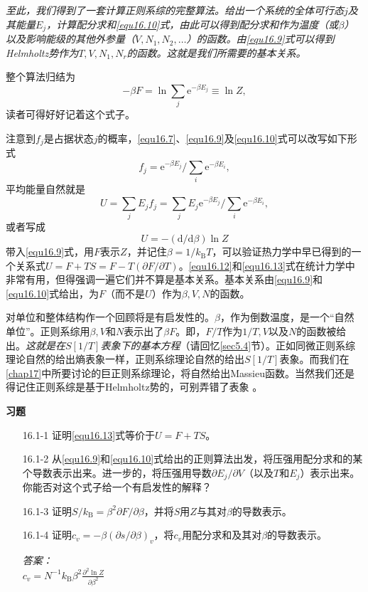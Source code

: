 {\it 至此，我们得到了一套计算正则系综的完整算法。给出一个系统的全体可行态$j$及其能量$E_j$，计算配分求和\ref{equ16.10}式，由此可以得到配分求和作为温度（或$\beta$）以及影响能级的其他外参量（$V,N_1,N_2,\dots$）的函数。由\eqref{equ16.9}式可以得到Helmholtz势作为$T,V,N_1,N_r$的函数。这就是我们所需要的基本关系。}

整个算法归结为
\begin{equation*}
-\beta F = \ln \sum\limits_j \mathrm e^{-\beta E_j} \equiv \ln Z,
\end{equation*}
读者可得好好记着这个式子。

注意到$f_j$是占据状态$j$的概率，\eqref{equ16.7}、\eqref{equ16.9}及\eqref{equ16.10}式可以改写如下形式
\begin{equation}
f_j  = {\mathrm e}^{-\beta E_j}/\sum\limits_i \mathrm e^{-\beta E_i},
\end{equation}
平均能量自然就是
\begin{equation}
U = \sum\limits_j E_jf_j = \sum\limits_j E_j{\mathrm e}^{-\beta E_j}/\sum\limits_i \mathrm e^{-\beta E_i},
\label{equ16.12}
\end{equation}
或者写成
\begin{equation}
U = -(\mathrm d/\mathrm d\beta)\ln Z
\label{equ16.13}
\end{equation}
带入\eqref{equ16.9}式，用$F$表示$Z$，并记住$\beta = 1/k_\text{B}T$，可以验证热力学中早已得到的一个关系式$U=F+TS=F-T(\partial F/\partial T)$。\eqref{equ16.12}和\eqref{equ16.13}式在统计力学中非常有用，但得强调一遍它们并不算是基本关系。基本关系由\eqref{equ16.9}和\eqref{equ16.10}式给出，为$F$（而不是$U$）作为$\beta,V,N$的函数。

对单位和整体结构作一个回顾将是有启发性的。$\beta$，作为倒数温度，是一个“自然单位”。正则系综用$\beta,V$和$N$表示出了$\beta F$。即，$F/T$作为$1/T,V$以及$N$的函数被给出。{\it 这就是在$S[1/T]$表象下的基本方程}（请回忆\ref{sec5.4}节）。正如同微正则系综理论自然的给出熵表象一样，正则系综理论自然的给出$S[1/T]$表象。而我们在\ref{chap17}中所要讨论的巨正则系综理论，将自然给出Massieu函数。当然我们还是得记住正则系综是基于Helmholtz势的，可别弄错了表象%
%
。

{\noindent\bf 习题}
\begin{itemize}
\item[16.1-1] 证明\eqref{equ16.13}式等价于$U=F+TS$。
\item[16.1-2] 从\eqref{equ16.9}和\eqref{equ16.10}式给出的正则算法出发，将压强用配分求和的某个导数表示出来。进一步的，将压强用导数$\partial E_j/\partial V$（以及$T$和$E_j$）表示出来。你能否对这个式子给一个有启发性的解释？
\item[16.1-3] 证明$S/k_\text{B}=\beta^2\partial F/\partial\beta$，并将$S$用$Z$与其对$\beta$的导数表示。
\item[16.1-4] 证明$c_v=-\beta(\partial s/\partial\beta)_v$，将$c_v$用配分求和及其对$\beta$的导数表示。
\begin{flushright}
{\it 答案：}\\
$c_v=N^{-1}k_\text{B}\beta^2\frac{\partial^2\ln Z}{\partial \beta^2}$
\end{flushright}
\end{itemize}


